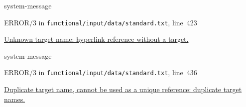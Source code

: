 \documentclass[a4paper]{article}
\begin{document}
\begin{DUclass}{system-message}
\begin{DUadmonition}

{\color{red}ERROR/3} in \texttt{functional/input/data/standard.txt}, line~423

\hyperlink{problematic-2}{
Unknown target name: \textquotedbl{}hyperlink reference without a target\textquotedbl{}.
}\end{DUadmonition}
\end{DUclass}

\begin{DUclass}{system-message}
\begin{DUadmonition}

{\color{red}ERROR/3} in \texttt{functional/input/data/standard.txt}, line~436

\hyperlink{problematic-3}{
Duplicate target name, cannot be used as a unique reference: \textquotedbl{}duplicate target names\textquotedbl{}.
}\end{DUadmonition}
\end{DUclass}
\end{document}
